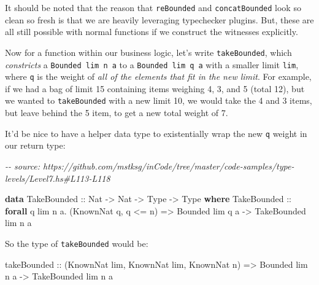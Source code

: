 \documentclass[]{article}
\newenvironment{Shaded}{}{}
\newcommand{\CommentTok}[1]{\textcolor[rgb]{0.38,0.63,0.69}{\textit{#1}}}
\newcommand{\DataTypeTok}[1]{\textcolor[rgb]{0.56,0.13,0.00}{#1}}
\newcommand{\KeywordTok}[1]{\textcolor[rgb]{0.00,0.44,0.13}{\textbf{#1}}}
\newcommand{\NormalTok}[1]{#1}
\newcommand{\OperatorTok}[1]{\textcolor[rgb]{0.40,0.40,0.40}{#1}}
\newcommand{\OtherTok}[1]{\textcolor[rgb]{0.00,0.44,0.13}{#1}}
\begin{document}
It should be noted that the reason that \texttt{reBounded} and
\texttt{concatBounded} look so clean so fresh is that we are heavily leveraging
typechecker plugins. But, these are all still possible with normal functions if
we construct the witnesses explicitly.

Now for a function within our business logic, let's write \texttt{takeBounded},
which \emph{constricts} a \texttt{Bounded\ lim\ n\ a} to a
\texttt{Bounded\ lim\textquotesingle{}\ q\ a} with a smaller limit
\texttt{lim\textquotesingle{}}, where \texttt{q} is the weight of \emph{all of
the elements that fit in the new limit}. For example, if we had a bag of limit
15 containing items weighing 4, 3, and 5 (total 12), but we wanted to
\texttt{takeBounded} with a new limit 10, we would take the 4 and 3 items, but
leave behind the 5 item, to get a new total weight of 7.

It'd be nice to have a helper data type to existentially wrap the new \texttt{q}
weight in our return type:

\begin{Shaded}
\begin{Highlighting}[]
\CommentTok{{-}{-} source: https://github.com/mstksg/inCode/tree/master/code{-}samples/type{-}levels/Level7.hs\#L113{-}L118}

\KeywordTok{data} \DataTypeTok{TakeBounded}\OtherTok{ ::} \DataTypeTok{Nat} \OtherTok{{-}\textgreater{}} \DataTypeTok{Nat} \OtherTok{{-}\textgreater{}} \DataTypeTok{Type} \OtherTok{{-}\textgreater{}} \DataTypeTok{Type} \KeywordTok{where}
  \DataTypeTok{TakeBounded} \OtherTok{::}
    \KeywordTok{forall}\NormalTok{ q lim n a}\OperatorTok{.}
\NormalTok{    (}\DataTypeTok{KnownNat}\NormalTok{ q, q }\OperatorTok{\textless{}=}\NormalTok{ n) }\OtherTok{=\textgreater{}}
    \DataTypeTok{Bounded}\NormalTok{ lim q a }\OtherTok{{-}\textgreater{}}
    \DataTypeTok{TakeBounded}\NormalTok{ lim n a}
\end{Highlighting}
\end{Shaded}

So the type of \texttt{takeBounded} would be:

\begin{Shaded}
\begin{Highlighting}[]
\OtherTok{takeBounded ::}
\NormalTok{  (}\DataTypeTok{KnownNat}\NormalTok{ lim, }\DataTypeTok{KnownNat}\NormalTok{ lim\textquotesingle{}, }\DataTypeTok{KnownNat}\NormalTok{ n) }\OtherTok{=\textgreater{}}
  \DataTypeTok{Bounded}\NormalTok{ lim n a }\OtherTok{{-}\textgreater{}}
  \DataTypeTok{TakeBounded}\NormalTok{ lim\textquotesingle{} n a}
\end{Highlighting}
\end{Shaded}
\end{document}
